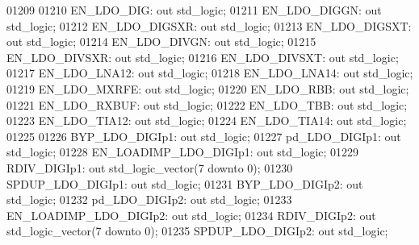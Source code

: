\begin{DoxyCode}
01209 
01210         EN\_LDO\_DIG: \textcolor{keywordflow}{out} \textcolor{comment}{std\_logic};
01211         EN\_LDO\_DIGGN:   \textcolor{keywordflow}{out} \textcolor{comment}{std\_logic};
01212         EN\_LDO\_DIGSXR:  \textcolor{keywordflow}{out} \textcolor{comment}{std\_logic};
01213         EN\_LDO\_DIGSXT:  \textcolor{keywordflow}{out} \textcolor{comment}{std\_logic};
01214         EN\_LDO\_DIVGN:   \textcolor{keywordflow}{out} \textcolor{comment}{std\_logic};
01215         EN\_LDO\_DIVSXR:  \textcolor{keywordflow}{out} \textcolor{comment}{std\_logic};
01216         EN\_LDO\_DIVSXT:  \textcolor{keywordflow}{out} \textcolor{comment}{std\_logic};
01217         EN\_LDO\_LNA12:   \textcolor{keywordflow}{out} \textcolor{comment}{std\_logic};
01218         EN\_LDO\_LNA14:   \textcolor{keywordflow}{out} \textcolor{comment}{std\_logic};
01219         EN\_LDO\_MXRFE:   \textcolor{keywordflow}{out} \textcolor{comment}{std\_logic};
01220         EN\_LDO\_RBB: \textcolor{keywordflow}{out} \textcolor{comment}{std\_logic};
01221         EN\_LDO\_RXBUF:   \textcolor{keywordflow}{out} \textcolor{comment}{std\_logic};
01222         EN\_LDO\_TBB: \textcolor{keywordflow}{out} \textcolor{comment}{std\_logic};
01223         EN\_LDO\_TIA12:   \textcolor{keywordflow}{out} \textcolor{comment}{std\_logic};
01224         EN\_LDO\_TIA14:   \textcolor{keywordflow}{out} \textcolor{comment}{std\_logic};
01225         
01226         BYP\_LDO\_DIGIp1: \textcolor{keywordflow}{out} \textcolor{comment}{std\_logic};
01227         pd\_LDO\_DIGIp1:  \textcolor{keywordflow}{out} \textcolor{comment}{std\_logic};
01228         EN\_LOADIMP\_LDO\_DIGIp1:  \textcolor{keywordflow}{out} \textcolor{comment}{std\_logic};
01229         RDIV\_DIGIp1:    \textcolor{keywordflow}{out} \textcolor{comment}{std\_logic\_vector}(\textcolor{vhdllogic}{}\textcolor{vhdllogic}{7} \textcolor{keywordflow}{downto} \textcolor{vhdllogic}{}\textcolor{vhdllogic}{0});
01230         SPDUP\_LDO\_DIGIp1:   \textcolor{keywordflow}{out} \textcolor{comment}{std\_logic};
01231         BYP\_LDO\_DIGIp2: \textcolor{keywordflow}{out} \textcolor{comment}{std\_logic};
01232         pd\_LDO\_DIGIp2:  \textcolor{keywordflow}{out} \textcolor{comment}{std\_logic};
01233         EN\_LOADIMP\_LDO\_DIGIp2:  \textcolor{keywordflow}{out} \textcolor{comment}{std\_logic};
01234         RDIV\_DIGIp2:    \textcolor{keywordflow}{out} \textcolor{comment}{std\_logic\_vector}(\textcolor{vhdllogic}{}\textcolor{vhdllogic}{7} \textcolor{keywordflow}{downto} \textcolor{vhdllogic}{}\textcolor{vhdllogic}{0});
01235         SPDUP\_LDO\_DIGIp2:   \textcolor{keywordflow}{out} \textcolor{comment}{std\_logic};

\end{DoxyCode}
